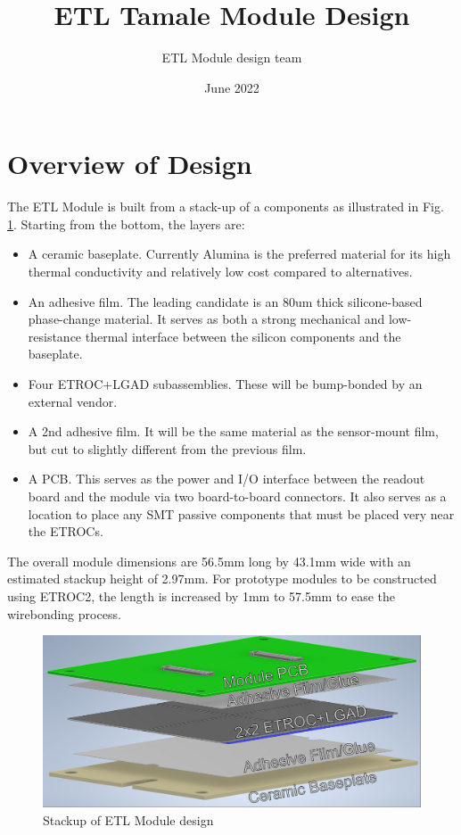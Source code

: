 \documentclass[10pt]{datasheet}
\title{ETL Tamale Module Design}
\author{ETL Module design team}
\date{June 2022}
\begin{document}
\maketitle


\onecolumn

\section{Overview of Design}

The ETL Module is built from a stack-up of a components as illustrated in Fig. \ref{fig:overview}. Starting from the bottom, the layers are:

\begin{itemize}
	\item A ceramic baseplate. Currently Alumina is the preferred material for its high thermal conductivity and relatively low cost compared to alternatives.
	\item An adhesive film. The leading candidate is an 80um thick silicone-based phase-change material. It serves as both a strong mechanical and low-resistance thermal interface between the silicon components and the baseplate.
	\item Four ETROC+LGAD subassemblies. These will be bump-bonded by an external vendor.
	\item A 2nd adhesive film. It will be the same material as the sensor-mount film, but cut to slightly different from the previous film.
	\item A PCB. This serves as the power and I/O interface between the readout board and the module via two board-to-board connectors. It also serves as a location to place any SMT passive components that must be placed very near the ETROCs.
\end{itemize}

The overall module dimensions are 56.5mm long by 43.1mm wide with an estimated stackup height of 2.97mm. For prototype modules to be constructed using ETROC2, the length is increased by 1mm to 57.5mm to ease the wirebonding process.


\begin{figure}[h]
	\centering
	\includegraphics[width=\textwidth]{figures/overview.png}
	\caption{Stackup of ETL Module design}
	\label{fig:overview}
\end{figure}
\end{document}
